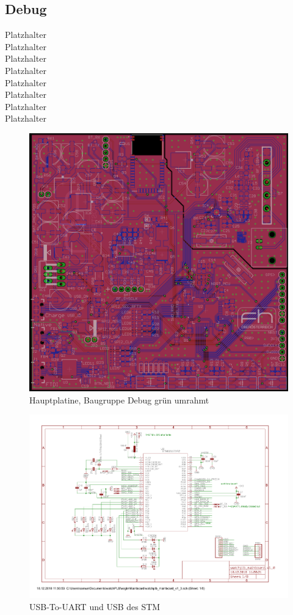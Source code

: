 \documentclass[a4paper]{scrartcl}
\begin{document}
\subsection{Debug}

Platzhalter\\Platzhalter\\Platzhalter\\Platzhalter\\Platzhalter\\Platzhalter\\
Platzhalter\\Platzhalter

\begin{figure}[H]\centering
\includegraphics[page=1, angle=0, width=\linewidth]{../Documentation/pics/mainboard_debug.png}
\caption{Hauptplatine, Baugruppe Debug grün umrahmt}
\end{figure}

\begin{figure}[H]\centering
\includegraphics[page=6, angle=90, width=\linewidth]{../eagle/Mainboard/watchplb_mainboard_v1_0.pdf}
\caption{USB-To-UART und USB des STM}
\end{figure}
\end{document}
